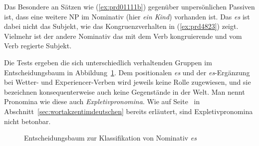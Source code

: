 \begin{exe}
  \ex\label{ex:prd01111} 
  \begin{xlist}
  \end{xlist}
\end{exe}

Das Besondere an Sätzen wie (\ref{ex:prd01111b}) gegenüber unpersönlichen Passiven ist, dass eine weitere NP im Nominativ (hier \textit{ein Kind}) vorhanden ist.
Das \textit{es} ist dabei nicht das Subjekt, wie das Kongruenzverhalten in (\ref{ex:prd4823}) zeigt.
Vielmehr ist der andere Nominativ das mit dem Verb kongruierende und vom Verb regierte Subjekt.

\begin{exe}
  \ex\label{ex:prd4823}
  \begin{xlist}
  \end{xlist}
\end{exe}

Die Tests ergeben die sich unterschiedlich verhaltenden Gruppen im Entscheidungsbaum in Abbildung~\ref{fig:escat}.
Dem positionalen \textit{es} und der \textit{es}-Ergänzung bei Wetter- und Experiencer-Verben wird jeweils keine Rolle zugewiesen, und sie bezeichnen konsequenterweise auch keine Gegenstände in der Welt.
Man nennt Pronomina wie diese auch \textit{Expletivpronomina}.
Wie auf Seite~\pageref{abs:expletbeton} in Abschnitt~\ref{sec:wortakzentimdeutschen} bereits erläutert, sind Expletivpronomina nicht betonbar.

\begin{figure}[!htbp]
  \caption{Entscheidungsbaum zur Klassifikation von Nominativ \textit{es}}
  \label{fig:escat}
\end{figure}

